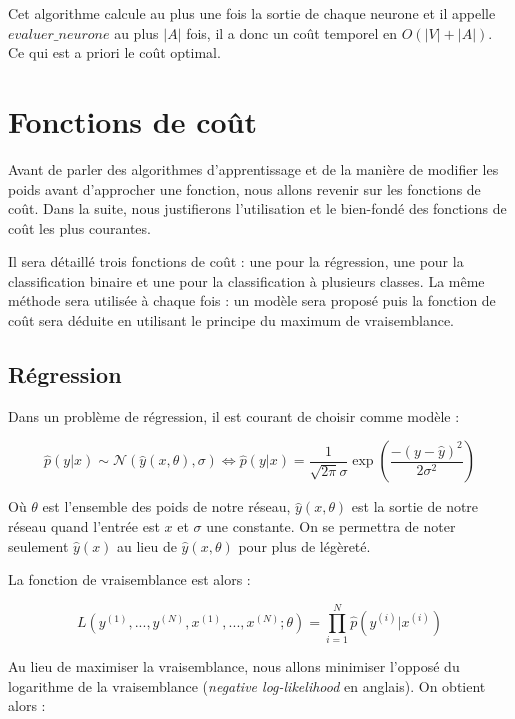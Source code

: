 \documentclass{report}
\begin{document}
Cet algorithme calcule au plus une fois la sortie de chaque neurone et il appelle $evaluer\_neurone$ au plus $|A|$ fois, il a donc un coût temporel en $O(|V|+|A|)$. Ce qui est a priori le coût optimal.

\section{Fonctions de coût}

Avant de parler des algorithmes d'apprentissage et de la manière de modifier les poids avant d'approcher une fonction, nous allons revenir sur les fonctions de coût. Dans la suite, nous justifierons l'utilisation et le bien-fondé des fonctions de coût les plus courantes.

Il sera détaillé trois fonctions de coût : une pour la régression, une pour la classification binaire et une pour la classification à plusieurs classes. La même méthode sera utilisée à chaque fois : un modèle sera proposé puis la fonction de coût sera déduite en utilisant le principe du maximum de vraisemblance.

\subsection{Régression}

Dans un problème de régression, il est courant de choisir comme modèle :

\begin{equation}
\hat{p}(y|x) \sim \mathcal{N}(\hat{y}(x, \theta), \sigma) \Leftrightarrow \hat{p}(y|x) = \frac{1}{\sqrt{2\pi}\sigma}\exp{(\frac{-(y - \hat{y})^2}{2\sigma^2})}
\label{modele_normale}
\end{equation}

Où $\theta$ est l'ensemble des poids de notre réseau, $\hat{y}(x, \theta)$ est la sortie de notre réseau quand l'entrée est $x$ et $\sigma$ une constante. On se permettra de noter seulement $\hat{y}(x)$ au lieu de $\hat{y}(x, \theta)$ pour plus de légèreté.

La fonction de vraisemblance est alors :

\begin{equation}
L(y^{(1)}, ..., y^{(N)}, x^{(1)}, ..., x^{(N)}; \theta) = \prod_{i=1}^{N}{\hat{p}(y^{(i)}|x^{(i)})}
\end{equation}

Au lieu de maximiser la vraisemblance, nous allons minimiser l'opposé du logarithme de la vraisemblance (\textit{negative log-likelihood} en anglais). On obtient alors :
\end{document}
